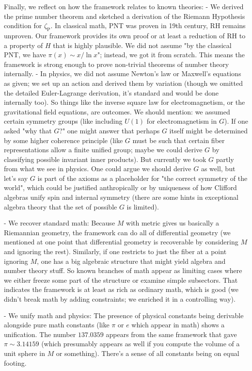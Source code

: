 \documentclass[11pt]{article}
\begin{document}
Finally, we reflect on how the framework relates to known theories:
- We derived the prime number theorem and sketched a derivation of the Riemann Hypothesis condition for $\zeta_{\mathrm{P}}$. In classical math, PNT was proven in 19th century, RH remains unproven. Our framework provides its own proof or at least a reduction of RH to a property of $H$ that is highly plausible. We did not assume "by the classical PNT, we have $\pi(x) \sim x/\ln x$"; instead, we got it from scratch. This means the framework is strong enough to prove non-trivial theorems of number theory internally.
- In physics, we did not assume Newton's law or Maxwell's equations as given; we set up an action and derived them by variation (though we omitted the detailed Euler-Lagrange derivation, it's standard and would be done internally too). So things like the inverse square law for electromagnetism, or the gravitational field equations, are outcomes. We should mention: we assumed certain symmetry groups (like including $U(1)$ for electromagnetism in $G$). If one asked "why that $G$?" one might answer that perhaps $G$ itself might be determined by some higher coherence principle (like $G$ must be such that certain fiber representations allow a finite unified group; maybe we could derive $G$ by classifying possible invariant inner products). But currently we took $G$ partly from what we see in physics. One could argue we should derive $G$ as well, but let's say $G$ is part of the axioms as a placeholder for "the correct symmetry of the world", which could be justified anthropically or by uniqueness of how Clifford algebras unify spin and internal symmetry (there are some hints in exceptional algebra theory that the set of possible $G$ is limited). 

- We recover standard math: Because $M$ with metric gives us basically a Riemannian geometry, the framework can do all of differential geometry (we mentioned at one point that differential geometry is recoverable by considering $M$ and ignoring the rest). Similarly, if one restricts to just the fiber at a point ignoring $M$, one has a big algebraic structure that might yield algebra and number theory stuff. So known branches of math appear as limiting cases where we either freeze some part of the structure or examine simple subsectors. That indicates the framework is at least as rich as ordinary math, which is good (we didn't break math by adding constraints; we enriched it in a controlling way).

- We unify math and physics: The presence of physical constants being derivable alongside pure math constants (like $\pi$ or $e$ which appear in math) shows a unification. The number $137.0359$ appears from the same framework that gave $\pi \sim 3.14159$ (which presumably appears as well if you compute the volume of a unit sphere in $M$ or something). There's a sense of all constants being on equal footing.
\end{document}
